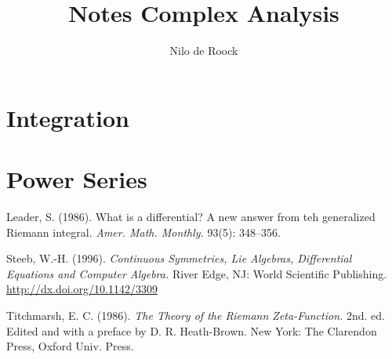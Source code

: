 \documentclass[oneside]{book}
\theoremstyle{theorem}
\theoremstyle{definition}
\begin{document}
    \title{Notes Complex Analysis}

    \author{Nilo de Roock}

    \maketitle

    \chapter{Integration}
    

    \chapter{Power Series}
    



    \begin{thebibliography}{3}

        Leader, S. (1986). What is a differential? A new answer from teh generalized Riemann integral. {\it Amer. Math. Monthly.\/} 93(5): 348--356.

        Steeb, W.-H. (1996). \textit{Continuous Symmetries, Lie Algebras, Differential Equations and Computer Algebra.\/} River Edge, NJ: World Scientific Publishing.  \href{http://dx.doi.org/10.1142/3309}{\url{http://dx.doi.org/10.1142/3309}}

        Titchmarsh, E. C. (1986). {\it The Theory of the Riemann Zeta-Function.\/} 2nd. ed. Edited and with a preface by D. R. Heath-Brown. New York: The Clarendon Press, Oxford Univ. Press.

    \end{thebibliography}
\end{document}
